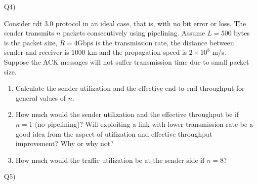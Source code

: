 \documentclass[10pt,letterpaper]{article}
\begin{document}
Q4)

Consider rdt 3.0 protocol in an ideal case, that is, with no bit error or loss. The sender transmits $n$ packets consecutively using pipelining. Assume $L=500$ bytes is the packet size, $R=4\text{Gbps}$ is the transmission rate, the distance between sender and receiver is 1000 km and the propagation speed is $2\times 10^8$ m/s. Suppose the ACK messages will not suffer transmission time due to small packet size.

\begin{enumerate}[label=\alph*-]
\item
Calculate the sender utilization and the effective end-to-end throughput for general values of $n$.
\item
How much would the sender utilization and the effective throughput be if $n=1$ (no pipelining)? Will exploiting a link with lower transmission rate be a good idea from the aspect of utilization and effective throughput improvement? Why or why not?
\item
How much would the traffic utilization be at the sender side if $n=8$?
\end{enumerate}
%

Q5)
\end{document}
